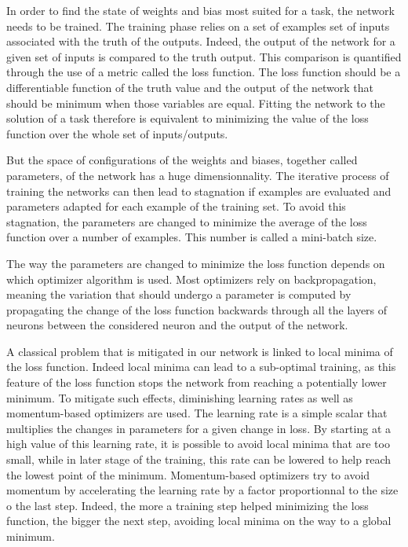 In order to find the state of weights and bias most suited for a task, the network needs to be trained.
The training phase relies on a set of examples set of inputs associated with the truth of the outputs. Indeed, the output of the network for a given set of inputs is compared to the truth output. This comparison is quantified through the use of a metric called the loss function. The loss function should be a differentiable function of the truth value and the output of the network that should be minimum when those variables are equal. Fitting the network to the solution of a task therefore is equivalent to minimizing the value of the loss function over the whole set of inputs/outputs.

But the space of configurations of the weights and biases, together called parameters, of the network has a huge dimensionnality. The iterative process of training the networks can then lead to stagnation if examples are evaluated and parameters adapted for each example of the training set. To avoid this stagnation, the parameters are changed to minimize the average of the loss function over a number of examples. This number is called a mini-batch size.

The way the parameters are changed to minimize the loss function depends on which optimizer algorithm is used. Most optimizers rely on backpropagation, meaning the variation that should undergo a parameter is computed by propagating the change of the loss function backwards through all the layers of neurons between the considered neuron and the output of the network. 


A classical problem that is mitigated in our network is linked to local minima of the loss function. Indeed local minima can lead to a sub-optimal training, as this feature of the loss function stops the network from reaching a potentially lower minimum. To mitigate such effects, diminishing learning rates as well as momentum-based optimizers are used. The learning rate is a simple scalar that multiplies the changes in parameters for a given change in loss. By starting at a high value of this learning rate, it is possible to avoid local minima that are too small, while in later stage of the training, this rate can be lowered to help reach the lowest point of the minimum. Momentum-based optimizers try to avoid momentum by accelerating the learning rate by a factor proportionnal to the size o the last step. Indeed, the more a training step helped minimizing the loss function, the bigger the next step, avoiding local minima on the way to a global minimum.


